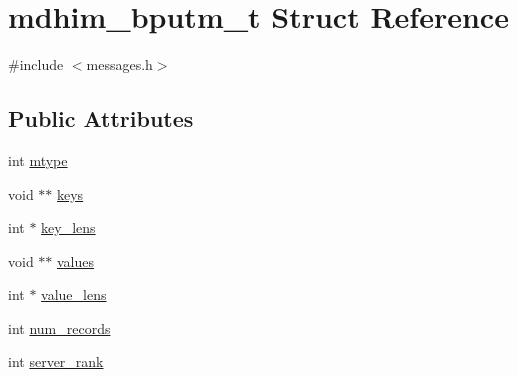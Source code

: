 \hypertarget{structmdhim__bputm__t}{\section{mdhim\-\_\-bputm\-\_\-t Struct Reference}
\label{d1/ddf/structmdhim__bputm__t}
}


{\ttfamily \#include $<$messages.\-h$>$}

\subsection*{Public Attributes}
\begin{DoxyCompactItemize}
\item 
int \hyperlink{structmdhim__bputm__t_a84865663becc6cfd06c5c7667b37244d}{mtype}
\item 
void $\ast$$\ast$ \hyperlink{structmdhim__bputm__t_a6cd17a8565bb662fdb1d52d878ce2a3d}{keys}
\item 
int $\ast$ \hyperlink{structmdhim__bputm__t_a528ae69dc41eab9b8e8d523d67debeac}{key\-\_\-lens}
\item 
void $\ast$$\ast$ \hyperlink{structmdhim__bputm__t_a1b908d082b136370db7574dc25d44853}{values}
\item 
int $\ast$ \hyperlink{structmdhim__bputm__t_a915478fbead386af153b4b3989ff7fb6}{value\-\_\-lens}
\item 
int \hyperlink{structmdhim__bputm__t_ad075b00254b3f26231b57134995d017b}{num\-\_\-records}
\item 
int \hyperlink{structmdhim__bputm__t_afd28a1e8797725473429ebed5ccc6800}{server\-\_\-rank}
\end{DoxyCompactItemize}


